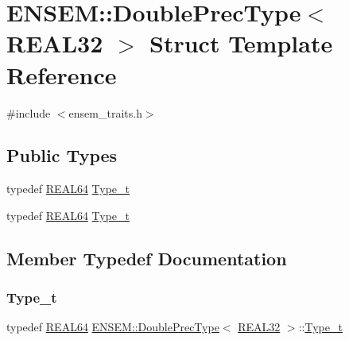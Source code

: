 \hypertarget{structENSEM_1_1DoublePrecType_3_01REAL32_01_4}{}\section{E\+N\+S\+EM\+:\+:Double\+Prec\+Type$<$ R\+E\+A\+L32 $>$ Struct Template Reference}
\label{structENSEM_1_1DoublePrecType_3_01REAL32_01_4}


{\ttfamily \#include $<$ensem\+\_\+traits.\+h$>$}

\subsection*{Public Types}
\begin{DoxyCompactItemize}
\item 
typedef \mbox{\hyperlink{namespaceENSEM_a85b215b9f1f43715aebee01718e25082}{R\+E\+A\+L64}} \mbox{\hyperlink{structENSEM_1_1DoublePrecType_3_01REAL32_01_4_ae855602a46f5a89750f4c0c7d39277e8}{Type\+\_\+t}}
\item 
typedef \mbox{\hyperlink{namespaceENSEM_a85b215b9f1f43715aebee01718e25082}{R\+E\+A\+L64}} \mbox{\hyperlink{structENSEM_1_1DoublePrecType_3_01REAL32_01_4_ae855602a46f5a89750f4c0c7d39277e8}{Type\+\_\+t}}
\end{DoxyCompactItemize}


\subsection{Member Typedef Documentation}
\mbox{\label{structENSEM_1_1DoublePrecType_3_01REAL32_01_4_ae855602a46f5a89750f4c0c7d39277e8}} 
\subsubsection{\texorpdfstring{Type\_t}{Type\_t}\hspace{0.1cm}{\footnotesize\ttfamily [1/2]}}
{\footnotesize\ttfamily typedef \mbox{\hyperlink{namespaceENSEM_a85b215b9f1f43715aebee01718e25082}{R\+E\+A\+L64}} \mbox{\hyperlink{structENSEM_1_1DoublePrecType}{E\+N\+S\+E\+M\+::\+Double\+Prec\+Type}}$<$ \mbox{\hyperlink{namespaceENSEM_a7540d01191172323e9073283d772576d}{R\+E\+A\+L32}} $>$\+::\mbox{\hyperlink{structENSEM_1_1DoublePrecType_3_01REAL32_01_4_ae855602a46f5a89750f4c0c7d39277e8}{Type\+\_\+t}}}

